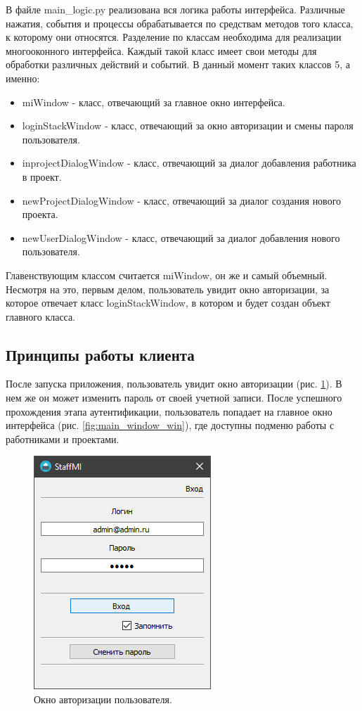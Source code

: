 \documentclass[14pt, a4paper]{extarticle}
\begin{document}
    

    В файле main\_logic.py реализована вся логика работы интерфейса. Различные нажатия, события и процессы обрабатывается по средствам методов того класса, к которому они относятся. Разделение по классам необходима для реализации многооконного интерфейса. Каждый такой класс имеет свои методы для обработки различных действий и событий. В данный момент таких классов 5, а именно:
    \begin{itemize}
        \item miWindow - класс, отвечающий за главное окно интерфейса.
        \item loginStackWindow - класс, отвечающий за окно авторизации и смены пароля пользователя.
        \item inprojectDialogWindow - класс, отвечающий за диалог добавления работника в проект.
        \item newProjectDialogWindow - класс, отвечающий за диалог создания нового проекта.
        \item newUserDialogWindow - класс, отвечающий за диалог добавления нового пользователя.
    \end{itemize}

    Главенствующим классом считается miWindow, он же и самый объемный. Несмотря на это, первым делом, пользователь увидит окно авторизации, за которое отвечает класс loginStackWindow, в котором и будет создан объект главного класса.


    \clearpage
    \subsection{Принципы работы клиента}
    После запуска приложения, пользователь увидит окно авторизации (рис. \ref{fig:auth_window_win}). В нем же он может изменить пароль от своей учетной записи. После успешного прохождения этапа аутентификации, пользователь попадает на главное окно интерфейса (рис. \ref{fig:main_window_win}), где доступны подменю работы с работниками и проектами.
    
    \begin{figure}[h]
        \centering
        \includegraphics[width=0.4\linewidth]{img/auth_window_win.png}
        \caption{Окно авторизации пользователя.}
        \label{fig:auth_window_win}
    \end{figure}
\end{document}
